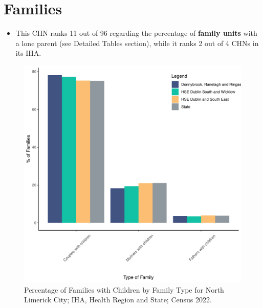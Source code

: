 \documentclass{article}
\begin{document}
\section{Families}\label{sect:Fam}
\begin{itemize}
\item This CHN ranks  11 out of 96 regarding the percentage of \textbf{family units} with a lone parent (see Detailed Tables section), while it ranks   2 out of 4 CHNs in its IHA.
\end{itemize}
\begin{figure}[H]
	\centering
	\includegraphics[width = 150mm]{../figures/FamED.pdf}
	\caption{Percentage of Families with Children by Family Type for North Limerick City; IHA, Health Region and State; Census 2022.}
	\label{fig:vbnv}
	\end{figure}
	
\end{document}
